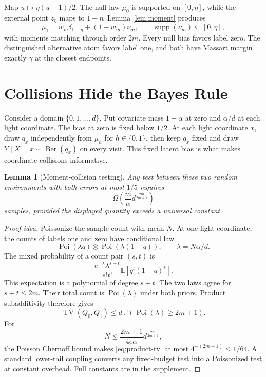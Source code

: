 \documentclass[twoside]{article}
\newtheorem{lemma}[theorem]{Lemma}
\newcommand{\E}{\mathbb E}
\newcommand{\PP}{\mathbb P}
\newcommand{\TV}{\operatorname{TV}}
\newcommand{\Ber}{\operatorname{Ber}}
\newcommand{\Poi}{\operatorname{Poi}}
\newcommand{\1}{\mathbf 1}
\begin{document}
Map $u\mapsto\eta(u+1)/2$. The null law $\mu_0$ is supported on $[0,\eta]$, while the external point $z_\eta$ maps to $1-\eta$. Lemma \ref{lem:moment} produces
\begin{equation}
 \mu_1=w_m\delta_{1-\eta}+(1-w_m)\nu_m,
 \qquad \operatorname{supp}(\nu_m)\subseteq[0,\eta],
 \label{eq:bias-priors}
\end{equation}
with moments matching through order $2m$. Every null bias favors label zero. The distinguished alternative atom favors label one, and both have Massart margin exactly $\gamma$ at the closest endpoints.

\section{Collisions Hide the Bayes Rule}
\label{sec:testing}

Consider a domain $\{0,1,\ldots,d\}$. Put covariate mass $1-\alpha$ at zero and $\alpha/d$ at each light coordinate. The bias at zero is fixed below $1/2$. At each light coordinate $x$, draw $q_x$ independently from $\mu_h$ for $h\in\{0,1\}$, then keep $q_x$ fixed and draw $Y\mid X=x\sim\Ber(q_x)$ on every visit. This fixed latent bias is what makes coordinate collisions informative.

\begin{lemma}[Moment-collision testing]
\label{lem:testing}
Any test between these two random environments with both errors at most $1/5$ requires
\begin{equation}
 \Omega\!\left(
 \frac{m}{\alpha}d^{\frac{2m}{2m+1}}
 \right)
 \label{eq:test-lower}
\end{equation}
samples, provided the displayed quantity exceeds a universal constant.
\end{lemma}

\begin{proof}[Proof idea]
Poissonize the sample count with mean $N$. At one light coordinate, the counts of labels one and zero have conditional law \[ \Poi(\lambda q)\otimes\Poi(\lambda(1-q)), \qquad \lambda=N\alpha/d. \] The mixed probability of a count pair $(s,t)$ is
\begin{equation}
 \frac{e^{-\lambda}\lambda^{s+t}}{s!t!}
 \E[q^t(1-q)^s].
 \label{eq:count-likelihood}
\end{equation}
This expectation is a polynomial of degree $s+t$. The two laws agree for $s+t\le2m$. Their total count is $\Poi(\lambda)$ under both priors. Product subadditivity therefore gives
\begin{equation}
 \TV(Q_0,Q_1)\le d\,\PP(\Poi(\lambda)\ge2m+1).
 \label{eq:product-tv}
\end{equation}
For \[ N\le \frac{2m+1}{4e\alpha}d^{\frac{2m}{2m+1}}, \] the Poisson Chernoff bound makes \eqref{eq:product-tv} at most $4^{-(2m+1)}\le1/64$. A standard lower-tail coupling converts any fixed-budget test into a Poissonized test at constant overhead. Full constants are in the supplement.
\end{proof}
\end{document}
